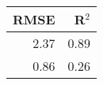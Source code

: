\begin{table}[ht]
\centering
\begin{tabular}{rr}
  \hline
RMSE & R$^{2}$ \\ 
  \hline
2.37 & 0.89 \\ 
  0.86 & 0.26 \\ 
   \hline
\end{tabular}
\end{table}

